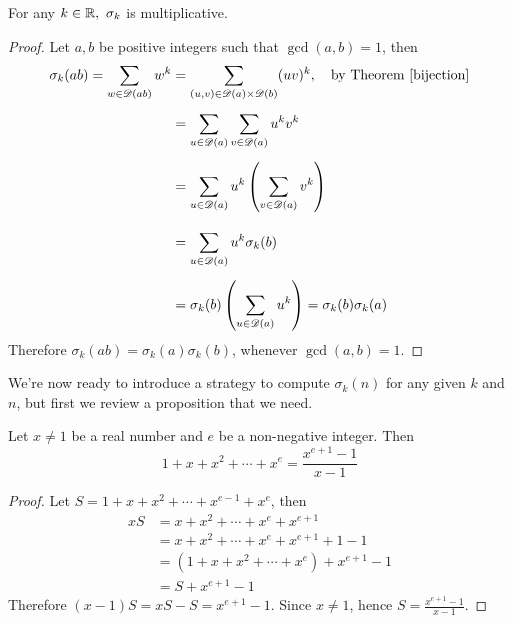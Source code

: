 \vspace*{1.5em}

\begin{theorem}
For any $k \in \mathbb R,\ \sigma_k$ is multiplicative.
\end{theorem}
\begin{proof}
Let $a,b$ be positive integers such that $\gcd(a,b) = 1$, then
\begin{align*}
\sigma_k(ab) = \sum_{w\in \mathscr{D}(ab)}w^k &= \sum_{(u,v)\in \mathscr{D}(a) \times \mathscr{D}(b)}(uv)^k ,\quad \text{by Theorem \ref{bijection}}\\[0.5em]
&= \sum_{u \in \mathscr{D}(a)}\sum_{v \in \mathscr{D}(a)}u^kv^k\\[0.5em]
&= \sum_{u \in \mathscr{D}(a)}u^k\left(\sum_{v \in \mathscr{D}(a)} v^k\right)\\[1em]
&= \sum_{u \in \mathscr{D}(a)}u^k\sigma_k(b)\\[0.5em]
&= \sigma_k(b)\left(\sum_{u \in \mathscr{D}(a)}u^k\right) = \sigma_k(b)\sigma_k(a)
\end{align*}
Therefore $\sigma_k(ab) = \sigma_k(a)\sigma_k(b)$, whenever $\gcd(a,b) = 1$.
\end{proof}

\vspace*{1em}

We're now ready to introduce a strategy to compute $\sigma_k(n)$ for any given $k$ and $n$, but first we review a proposition that we need.

\vspace*{0.5em}

\begin{proposition}\label{geomsum}
Let $x\neq 1$ be a real number and $e$ be a non-negative integer. Then 
\[1 + x + x^2 + \cdots + x^e = \frac{x^{e+1}-1}{x-1}\]
\end{proposition}
\begin{proof}
Let $S = 1 + x + x^2 + \cdots + x^{e-1} + x^e$, then
\begin{align*}
xS &= x + x^2 + \cdots + x^e + x^{e+1}\\[0.5em]
&= x + x^2 + \cdots + x^e + x^{e+1} + 1 - 1\\[0.5em]
&= (1 + x + x^2 + \cdots + x^e) + x^{e+1} - 1\\[0.5em]
&= S + x^{e+1} - 1
\end{align*}
Therefore $(x-1)S = xS- S = x^{e+1} - 1$. Since $x\neq 1$, hence $\displaystyle S = \frac{x^{e+1}-1}{x-1}$.
\end{proof}

